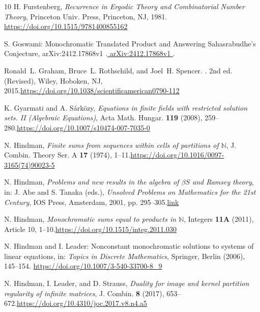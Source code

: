 \documentclass{article}
\theoremstyle{Theorem}
\theoremstyle{definition}
\begin{document}
\begin{thebibliography}{10}
 H. Furstenberg, \textit{Recurrence in Ergodic Theory and Combinatorial Number Theory}, Princeton Univ. Press, Princeton, NJ, 1981.\href{ https://doi.org/10.1515/9781400855162 }{ https://doi.org/10.1515/9781400855162 }

 S. Goswami: Monochromatic Translated Product and Answering Sahasrabudhe's Conjecture,  arXiv:2412.17868v1 .\href{ arXiv:2412.17868v1 }{ arXiv:2412.17868v1 }.

Ronald~L. Graham, Bruce~L. Rothschild, and Joel~H. Spencer.
.
\newblock 2nd ed. (Revised), Wiley, Hoboken, NJ, 2015.\href{https://doi.org/10.1038/scientificamerican0790-112 }{https://doi.org/10.1038/scientificamerican0790-112 }



 K. Gyarmati and A. S\'{a}rk\"{o}zy, \textit{Equations in finite fields with restricted solution sets. II (Algebraic Equations)}, Acta Math. Hungar. \textbf{119} (2008), 259–280.\href{https://doi.org/10.1007/s10474-007-7035-0 }{https://doi.org/10.1007/s10474-007-7035-0 }

 N. Hindman, \textit{Finite sums from sequences within cells of partitions of $\mathbb{N}$}, J. Combin. Theory Ser. A \textbf{17} (1974), 1–11.\href{https://doi.org/10.1016/0097-3165(74)90023-5 }{https://doi.org/10.1016/0097-3165(74)90023-5 }

 N. Hindman, \textit{Problems and new results in the algebra of $\beta S$ and Ramsey theory}, in: J. Abe and S. Tanaka (eds.), \textit{Unsolved Problems on Mathematics for the 21st Century}, IOS Press, Amsterdam, 2001, pp. 295–305.\href{chrome-extension://efaidnbmnnnibpcajpcglclefindmkaj/http://www.nhindman.us/research/iseki.pdf}{link}

 N. Hindman, \textit{Monochromatic sums equal to products in $\mathbb{N}$}, Integers \textbf{11A} (2011), Article 10, 1–10.\href{https://doi.org/10.1515/integ.2011.030 }{https://doi.org/10.1515/integ.2011.030 }

 N. Hindman and I. Leader: Nonconstant monochromatic solutions to systems of linear equations, in: \emph{Topics in Discrete Mathematics}, Springer, Berlin (2006), 145–154.
\href{https://doi.org/10.1007/3-540-33700-8\_9}{https://doi.org/10.1007/3-540-33700-8\_9}


 N. Hindman, I. Leader, and D. Strauss, \textit{Duality for image and kernel partition regularity of infinite matrices}, J. Combin. \textbf{8} (2017), 653–672.\href{https://doi.org/10.4310/joc.2017.v8.n4.a5 }{https://doi.org/10.4310/joc.2017.v8.n4.a5 }


\end{thebibliography}
\end{document}
